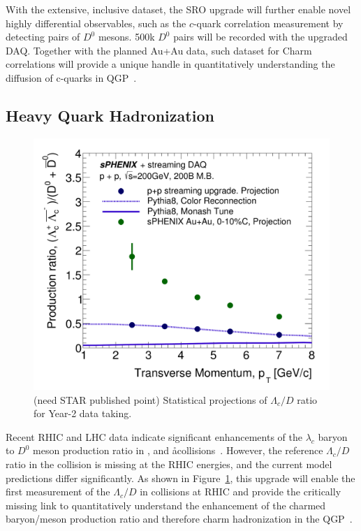 With the extensive, inclusive dataset, the SRO upgrade will further enable novel highly differential observables, such as the $c$-quark correlation measurement by detecting pairs of $D^0$ mesons. 500k $D^0$ pairs will be recorded with the upgraded DAQ. Together with the planned Au+Au data, such dataset for Charm correlations will provide a unique handle in quantitatively understanding the diffusion of c-quarks in QGP~\cite{something}. 

\subsection{Heavy Quark Hadronization}



\begin{figure}[htbp]
\begin{center}
\includegraphics[width=.49\linewidth]{figs/RAA_DB_theory_root_LcD0Ratio_pp200B.pdf}
\caption{(need STAR published point) Statistical projections of $\Lambda_c/D$ ratio for Year-2 data taking.}
\label{fig:Lc-D0}
\end{center}
\end{figure}



Recent RHIC and LHC data indicate significant enhancements of the
$\lambda_c$ baryon to $D^0$ meson production ratio in \pp,  \pA and
\aa  collisions~\cite{something}. However, the reference $\Lambda_c/D$
ratio in the \pp collision is missing at the RHIC energies, and the
current model predictions differ significantly. As shown in
Figure~\ref{fig:Lc-D0}, this upgrade will enable the first measurement
of the $\Lambda_c/D$ in \pp collisions at RHIC and provide the
critically missing link to quantitatively understand the enhancement
of the charmed baryon/meson production ratio and therefore charm
hadronization in the QGP~\cite{something}.  


